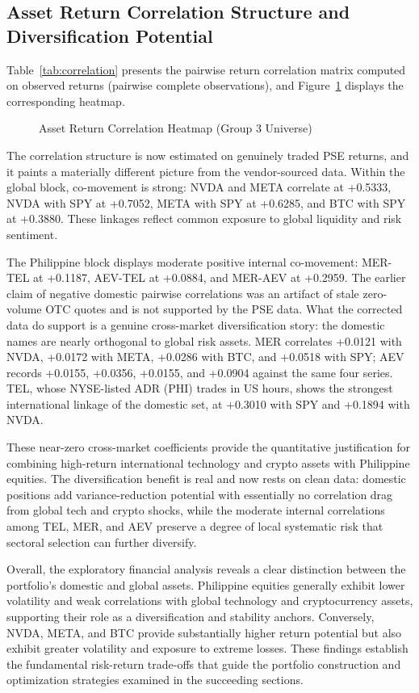 \subsection{Asset Return Correlation Structure and Diversification Potential}

Table~\ref{tab:correlation} presents the pairwise return correlation matrix computed on observed returns (pairwise complete observations), and Figure~\ref{fig:correlation_heatmap} displays the corresponding heatmap.



\begin{figure}[H]
  \centering
  \caption{Asset Return Correlation Heatmap (Group 3 Universe)}
  \label{fig:correlation_heatmap}
\end{figure}

The correlation structure is now estimated on genuinely traded PSE returns, and it paints a materially different picture from the vendor-sourced data. Within the global block, co-movement is strong: NVDA and META correlate at +0.5333, NVDA with SPY at +0.7052, META with SPY at +0.6285, and BTC with SPY at +0.3880. These linkages reflect common exposure to global liquidity and risk sentiment.

The Philippine block displays moderate positive internal co-movement: MER-TEL at +0.1187, AEV-TEL at +0.0884, and MER-AEV at +0.2959. The earlier claim of negative domestic pairwise correlations was an artifact of stale zero-volume OTC quotes and is not supported by the PSE data. What the corrected data do support is a genuine cross-market diversification story: the domestic names are nearly orthogonal to global risk assets. MER correlates +0.0121 with NVDA, +0.0172 with META, +0.0286 with BTC, and +0.0518 with SPY; AEV records +0.0155, +0.0356, +0.0155, and +0.0904 against the same four series. TEL, whose NYSE-listed ADR (PHI) trades in US hours, shows the strongest international linkage of the domestic set, at +0.3010 with SPY and +0.1894 with NVDA.

These near-zero cross-market coefficients provide the quantitative justification for combining high-return international technology and crypto assets with Philippine equities. The diversification benefit is real and now rests on clean data: domestic positions add variance-reduction potential with essentially no correlation drag from global tech and crypto shocks, while the moderate internal correlations among TEL, MER, and AEV preserve a degree of local systematic risk that sectoral selection can further diversify.

Overall, the exploratory financial analysis reveals a clear distinction between the portfolio's domestic and global assets. Philippine equities generally exhibit lower volatility and weak correlations with global technology and cryptocurrency assets, supporting their role as a diversification and stability anchors. Conversely, NVDA, META, and BTC provide substantially higher return potential but also exhibit greater volatility and exposure to extreme losses. These findings establish the fundamental risk-return trade-offs that guide the portfolio construction and optimization strategies examined in the succeeding sections.